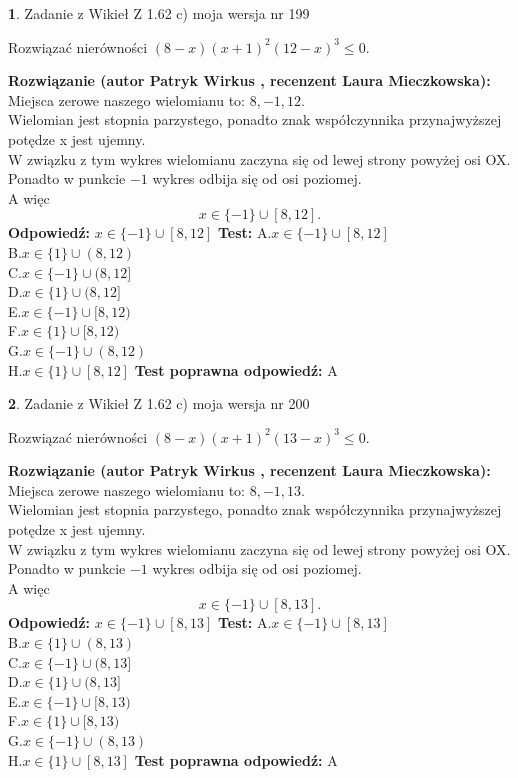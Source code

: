 \documentclass[12pt, a4paper]{article}
\theoremstyle{definition} %
\newtheorem{zad}{}
\newcommand{\zadStart}[1]{\begin{zad}#1\newline}
\newcommand{\zadStop}{\end{zad}}
\newcommand{\rozwStart}[2]{\noindent \textbf{Rozwiązanie (autor #1 , recenzent #2): }\newline}
\newcommand{\rozwStop}{\newline}
\newcommand{\odpStart}{\noindent \textbf{Odpowiedź:}\newline}
\newcommand{\odpStop}{\newline}
\newcommand{\testStart}{\noindent \textbf{Test:}\newline}
\newcommand{\testStop}{\newline}
\newcommand{\kluczStart}{\noindent \textbf{Test poprawna odpowiedź:}\newline}
\newcommand{\kluczStop}{\newline}
\begin{document}
\zadStart{Zadanie z Wikieł Z 1.62 c) moja wersja nr 199}

Rozwiązać nierówności $(8-x)(x+1)^{2}(12-x)^{3}\le0$.
\zadStop
\rozwStart{Patryk Wirkus}{Laura Mieczkowska}
Miejsca zerowe naszego wielomianu to: $8, -1, 12$.\\
Wielomian jest stopnia parzystego, ponadto znak współczynnika przy\linebreak najwyższej potędze x jest ujemny.\\ W związku z tym wykres wielomianu zaczyna się od lewej strony powyżej osi OX.\\
Ponadto w punkcie $-1$ wykres odbija się od osi poziomej.\\
A więc $$x \in \{-1\} \cup [8,12].$$
\rozwStop
\odpStart
$x \in \{-1\} \cup [8,12]$
\odpStop
\testStart
A.$x \in \{-1\} \cup [8,12]$\\
B.$x \in \{1\} \cup (8,12)$\\
C.$x \in \{-1\} \cup (8,12]$\\
D.$x \in \{1\} \cup (8,12]$\\
E.$x \in \{-1\} \cup [8,12)$\\
F.$x \in \{1\} \cup [8,12)$\\
G.$x \in \{-1\} \cup (8,12)$\\
H.$x \in \{1\} \cup [8,12]$
\testStop
\kluczStart
A
\kluczStop



\zadStart{Zadanie z Wikieł Z 1.62 c) moja wersja nr 200}

Rozwiązać nierówności $(8-x)(x+1)^{2}(13-x)^{3}\le0$.
\zadStop
\rozwStart{Patryk Wirkus}{Laura Mieczkowska}
Miejsca zerowe naszego wielomianu to: $8, -1, 13$.\\
Wielomian jest stopnia parzystego, ponadto znak współczynnika przy\linebreak najwyższej potędze x jest ujemny.\\ W związku z tym wykres wielomianu zaczyna się od lewej strony powyżej osi OX.\\
Ponadto w punkcie $-1$ wykres odbija się od osi poziomej.\\
A więc $$x \in \{-1\} \cup [8,13].$$
\rozwStop
\odpStart
$x \in \{-1\} \cup [8,13]$
\odpStop
\testStart
A.$x \in \{-1\} \cup [8,13]$\\
B.$x \in \{1\} \cup (8,13)$\\
C.$x \in \{-1\} \cup (8,13]$\\
D.$x \in \{1\} \cup (8,13]$\\
E.$x \in \{-1\} \cup [8,13)$\\
F.$x \in \{1\} \cup [8,13)$\\
G.$x \in \{-1\} \cup (8,13)$\\
H.$x \in \{1\} \cup [8,13]$
\testStop
\kluczStart
A
\kluczStop
\end{document}
